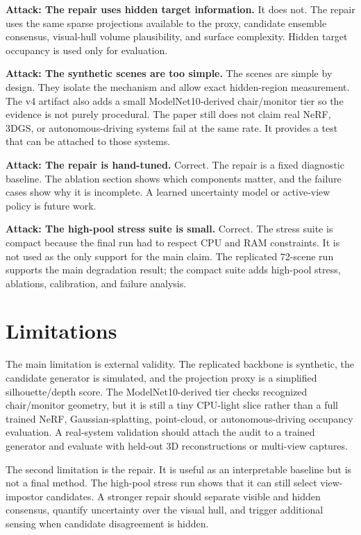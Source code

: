\documentclass{article}
\begin{document}
\textbf{Attack: The repair uses hidden target information.}
It does not. The repair uses the same sparse projections available to the
proxy, candidate ensemble consensus, visual-hull volume plausibility, and
surface complexity. Hidden target occupancy is used only for evaluation.

\textbf{Attack: The synthetic scenes are too simple.}
The scenes are simple by design. They isolate the mechanism and allow exact
hidden-region measurement. The v4 artifact also adds a small ModelNet10-derived
chair/monitor tier so the evidence is not purely procedural. The paper still
does not claim real NeRF, 3DGS, or autonomous-driving systems fail at the same
rate. It provides a test that can be attached to those systems.

\textbf{Attack: The repair is hand-tuned.}
Correct. The repair is a fixed diagnostic baseline. The ablation section shows
which components matter, and the failure cases show why it is incomplete. A
learned uncertainty model or active-view policy is future work.

\textbf{Attack: The high-pool stress suite is small.}
Correct. The stress suite is compact because the final run had to respect CPU
and RAM constraints. It is not used as the only support for the main claim. The
replicated 72-scene run supports the main degradation result; the compact suite
adds high-pool stress, ablations, calibration, and failure analysis.

\section{Limitations}

The main limitation is external validity. The replicated backbone is synthetic,
the candidate generator is simulated, and the projection proxy is a simplified
silhouette/depth score. The ModelNet10-derived tier checks recognized
chair/monitor geometry, but it is still a tiny CPU-light slice rather than a
full trained NeRF, Gaussian-splatting, point-cloud, or autonomous-driving
occupancy evaluation. A real-system validation should attach the audit to a
trained generator and evaluate with held-out 3D reconstructions or multi-view
captures.

The second limitation is the repair. It is useful as an interpretable baseline
but is not a final method. The high-pool stress run shows that it can still
select view-impostor candidates. A stronger repair should separate visible and
hidden consensus, quantify uncertainty over the visual hull, and trigger
additional sensing when candidate disagreement is hidden.
\end{document}
